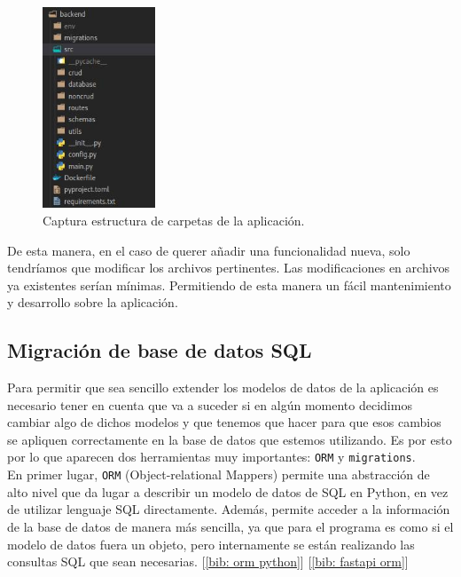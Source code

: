 \documentclass[a4paper, oneside, 12pt]{book}
\begin{document}
	\pagebreak
	
	\begin{figure}[h!]
		\begin{center}
			\includegraphics[width=0.3\textwidth]{img/folder_structure.jpg}
			\caption{Captura estructura de carpetas de la aplicación.}
			\label{img: folder structure}
		\end{center}
	\end{figure}

	\noindent De esta manera, en el caso de querer añadir una funcionalidad nueva, solo tendríamos que modificar los archivos pertinentes. Las modificaciones en archivos ya existentes serían mínimas. Permitiendo de esta manera un fácil mantenimiento y desarrollo sobre la aplicación. \\
	
	\subsection{Migración de base de datos SQL}
	
	\noindent Para permitir que sea sencillo extender los modelos de datos de la aplicación es necesario tener en cuenta que va a suceder si en algún momento decidimos cambiar algo de dichos modelos y que tenemos que hacer para que esos cambios se apliquen correctamente en la base de datos que estemos utilizando. Es por esto por lo que aparecen dos herramientas muy importantes: \texttt{ORM} y \texttt{migrations}.  \\
	
	\noindent En primer lugar, \texttt{ORM} (Object-relational Mappers) permite una abstracción de alto nivel que da lugar a describir un modelo de datos de SQL en Python, en vez de utilizar lenguaje SQL directamente. Además, permite acceder a la información de la base de datos de manera más sencilla, ya que para el programa es como si el modelo de datos fuera un objeto, pero internamente se están realizando las consultas SQL que sean necesarias. [\ref{bib: orm python}] [\ref{bib: fastapi orm}] \\
	
\end{document}
